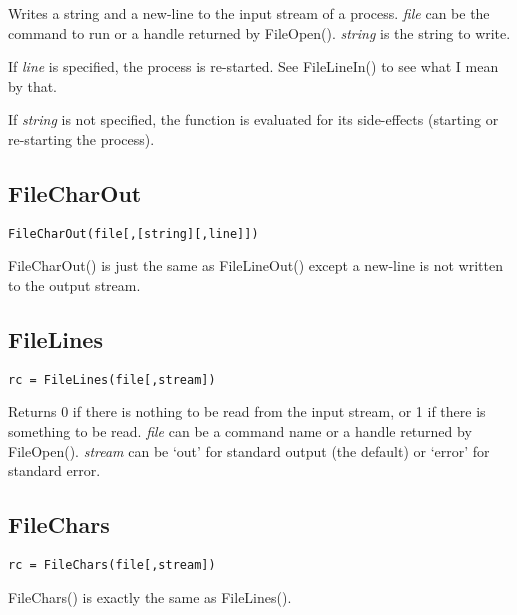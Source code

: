 \documentclass{article}
\begin{document}
Writes a string and a new-line to the input stream of a process.
{\it file} can be the command to run or a handle returned by FileOpen().
{\it string} is the string to write.

If {\it line} is specified, the process is re-started. See FileLineIn()
to see what I mean by that.

If {\it string} is not specified, the function is evaluated for its
side-effects (starting or re-starting the process).

\subsection{FileCharOut}

\begin{verbatim}
FileCharOut(file[,[string][,line]])
\end{verbatim}

FileCharOut() is just the same as FileLineOut() except a new-line is not
written to the output stream.

\subsection{FileLines}

\begin{verbatim}
rc = FileLines(file[,stream])
\end{verbatim}

Returns 0 if there is nothing to be read from the input stream, or 1 if
there is something to be read. {\it file} can be a command name or
a handle returned by FileOpen(). {\it stream} can be `out' for standard
output (the default) or `error' for standard error.

\subsection{FileChars}

\begin{verbatim}
rc = FileChars(file[,stream])
\end{verbatim}

FileChars() is exactly the same as FileLines().
\end{document}
